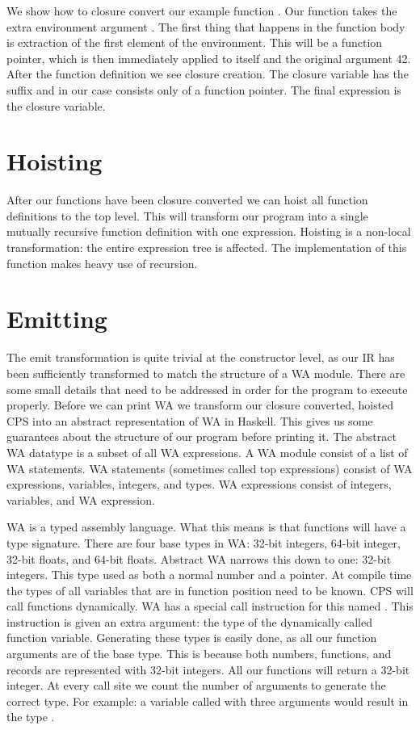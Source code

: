 We show how to closure convert our example function . Our function  takes the extra environment argument . The first thing that happens in the function body is extraction of the first element of the environment. This will be a function pointer, which is then immediately applied to itself and the original argument 42. After the function definition we see closure creation. The closure variable has the  suffix and in our case consists only of a function pointer. The final expression is the closure variable.

\section{\label{section:hoist}Hoisting}
After our functions have been closure converted we can hoist all function definitions to the top level. This will transform our program into a single mutually recursive function definition with one expression. Hoisting is a non-local transformation: the entire expression tree is affected. The implementation of this function makes heavy use of recursion.

\section{\label{section:emit}Emitting}
The emit transformation is quite trivial at the constructor level, as our \ac{IR} has been sufficiently transformed to match the structure of a \ac{WA} module. There are some small details that need to be addressed in order for the program to execute properly. Before we can print \ac{WA} we transform our closure converted, hoisted \ac{CPS} into an abstract representation of \ac{WA} in Haskell. This gives us some guarantees about the structure of our program before printing it. The abstract \ac{WA} datatype is a subset of all \ac{WA} expressions. A \ac{WA} module consist of a list of \ac{WA} statements. \ac{WA} statements (sometimes called top expressions) consist of \ac{WA} expressions, variables, integers, and types. \ac{WA} expressions consist of integers, variables, and \ac{WA} expression.

\ac{WA} is a typed assembly language. What this means is that functions will have a type signature. There are four base types in \ac{WA}: 32-bit integers, 64-bit integer, 32-bit floats, and 64-bit floats. Abstract \ac{WA} narrows this down to one: 32-bit integers. This type used as both a normal number and a pointer. At compile time the types of all variables that are in function position need to be known. \ac{CPS} will call functions dynamically. \ac{WA} has a special call instruction for this named . This instruction is given an extra argument: the type of the dynamically called function variable. Generating these types is easily done, as all our function arguments are of the base type. This is because both numbers, functions, and records are represented with 32-bit integers. All our functions will return a 32-bit integer. At every call site we count the number of arguments to generate the correct type. For example: a variable  called with three arguments would result in the type .

